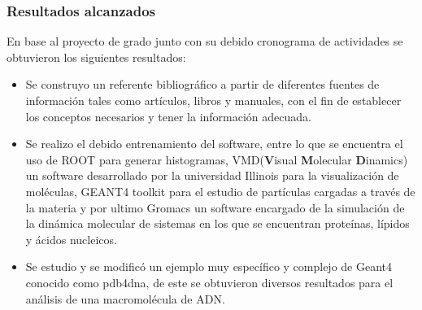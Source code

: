 \subsubsection{Resultados alcanzados}
En base al proyecto de grado junto con su debido cronograma de actividades se obtuvieron los siguientes resultados:
\begin{itemize}
  \item Se construyo un referente bibliográfico	
a partir de diferentes fuentes de información tales como
artículos, libros y manuales, con el fin de establecer los conceptos necesarios y tener la información adecuada.
\item Se realizo el debido entrenamiento del software, entre lo que se encuentra el uso de ROOT para generar histogramas, VMD(\textbf{V}isual \textbf{M}olecular \textbf{D}inamics) un software desarrollado por la universidad Illinois para la visualización de moléculas, GEANT4 toolkit para el estudio de partículas cargadas a través de la materia y por ultimo Gromacs un software encargado de la simulación de la dinámica molecular de sistemas en los que se encuentran proteínas, lípidos y ácidos nucleicos.
\item Se estudio y se modificó un ejemplo muy específico y complejo de Geant4 conocido como pdb4dna, de este se obtuvieron diversos resultados para el análisis de una macromolécula de ADN.
\end{itemize}
